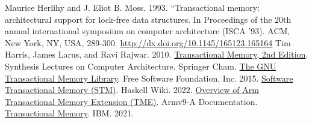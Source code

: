 \documentclass [12pt]{article}
\begin{document}
\begin{thebibliography}{1}
    Maurice Herlihy and J. Eliot B. Moss. 1993. “Transactional memory: architectural support for lock-free data structures. In Proceedings of the 20th annual international symposium on computer architecture (ISCA '93). ACM, New York, NY, USA, 289-300. \url{http://dx.doi.org/10.1145/165123.165164}  
    Tim Harris, James Larus, and Ravi Rajwar. 2010. \href{https://link.springer.com/book/10.1007/978-3-031-01728-5}{Transactional Memory, 2nd Edition}. Synthesis Lectures on Computer Architecture. Springer Cham.
    \href{https://gcc.gnu.org/onlinedocs/gcc-5.5.0/libitm.pdf}{The GNU Transactional Memory Library}. Free Software Foundation, Inc. 2015.
    \href{https://wiki.haskell.org/Software_transactional_memory}{Software Transactional Memory (STM)}. Haskell Wiki. 2022.
    \href{https://developer.arm.com/documentation/102873/0100/The-Arm-Transactional-Memory-Extension}{Overview of Arm Transactional Memory Extension (TME)}. Armv9-A Documentation. 
    \href{https://www.ibm.com/docs/en/xffbg/121.141?topic=fortran-transactional-memory}{Transactional Memory}. IBM. 2021. 
\end{thebibliography}
\end{document}
